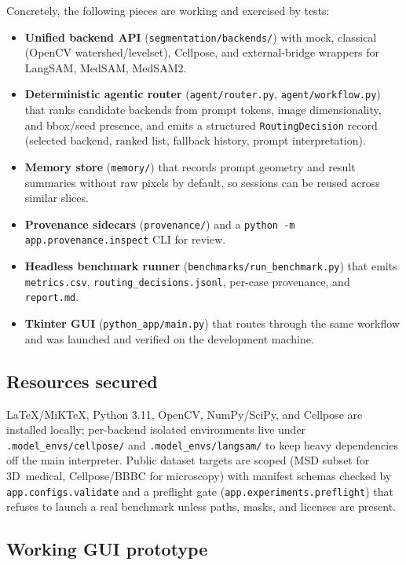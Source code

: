 \documentclass[10pt,letterpaper,twocolumn]{article}
\begin{document}
Concretely, the following pieces are working and exercised by tests:

\begin{itemize}
  \setlength{\itemsep}{1pt}
  \item \textbf{Unified backend API} (\texttt{segmentation/backends/})
    with mock, classical (OpenCV watershed/levelset), Cellpose, and
    external-bridge wrappers for LangSAM, MedSAM, MedSAM2.
  \item \textbf{Deterministic agentic router}
    (\texttt{agent/router.py}, \texttt{agent/workflow.py}) that ranks
    candidate backends from prompt tokens, image dimensionality, and
    bbox/seed presence, and emits a structured
    \texttt{RoutingDecision} record (selected backend, ranked list,
    fallback history, prompt interpretation).
  \item \textbf{Memory store} (\texttt{memory/}) that records prompt
    geometry and result summaries without raw pixels by default, so
    sessions can be reused across similar slices.
  \item \textbf{Provenance sidecars}
    (\texttt{provenance/}) and a \texttt{python -m
    app.provenance.inspect} CLI for review.
  \item \textbf{Headless benchmark runner}
    (\texttt{benchmarks/run\_benchmark.py}) that emits
    \texttt{metrics.csv}, \texttt{routing\_decisions.jsonl},
    per-case provenance, and \texttt{report.md}.
  \item \textbf{Tkinter GUI} (\texttt{python\_app/main.py}) that
    routes through the same workflow and was launched and verified
    on the development machine.
\end{itemize}

\subsection{Resources secured}

LaTeX/MiKTeX, Python 3.11, OpenCV, NumPy/SciPy, and Cellpose are
installed locally; per-backend isolated environments live under
\texttt{.model\_envs/cellpose/} and \texttt{.model\_envs/langsam/}
to keep heavy dependencies off the main interpreter. Public dataset
targets are scoped (MSD subset for 3D~medical, Cellpose/BBBC for
microscopy) with manifest schemas checked by
\texttt{app.configs.validate} and a preflight gate
(\texttt{app.experiments.preflight}) that refuses to launch a real
benchmark unless paths, masks, and licenses are present.

\subsection{Working GUI prototype}
\end{document}
